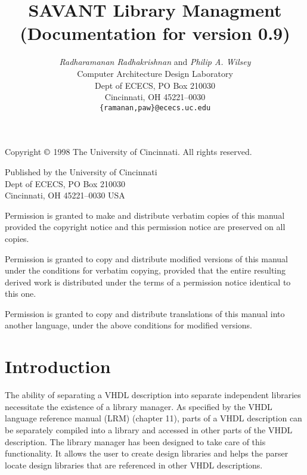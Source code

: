 \documentclass[11pt]{report}
\newcommand{\version}{0.9}
\begin{document}
\title{
\textbf{SAVANT Library Managment} \\
(Documentation for version \version)}

\author{
\emph{Radharamanan Radhakrishnan} and \emph{Philip A.  Wilsey} \\
Computer Architecture Design Laboratory \\
Dept of ECECS, PO Box 210030 \\
Cincinnati, OH  45221--0030 \\
\texttt{\{ramanan,paw\}@ececs.uc.edu}
}

\date{}

\maketitle

\vspace*{6in}

\noindent
Copyright $\copyright$ 1998 The University of Cincinnati.  All
rights reserved.  

\bigskip

\noindent
Published by the University of Cincinnati \\
Dept of ECECS, PO Box 210030 \\
Cincinnati, OH  45221--0030 USA 

\bigskip

\noindent
Permission is granted to make and distribute verbatim copies of
this manual provided the copyright notice and this permission notice
are preserved on all copies.

\medskip
\noindent
Permission is granted to copy and distribute modified versions of this
manual under the conditions for verbatim copying, provided that the entire
resulting derived work is distributed under the terms of a permission
notice identical to this one.

\medskip
\noindent
Permission is granted to copy and distribute translations of this manual
into another language, under the above conditions for modified versions.

\newpage

\tableofcontents

\chapter{Introduction}

The ability of separating a VHDL description into separate independent
libraries necessitate the existence of a library manager.  As specified by
the VHDL language reference manual (LRM) (chapter 11), parts of a VHDL
description can be separately compiled into a library and accessed in
other parts of the VHDL description.  The library manager has been
designed to take care of this functionality.  It allows the user to create
design libraries and helps the parser locate design libraries that are
referenced in other VHDL descriptions.
\end{document}
